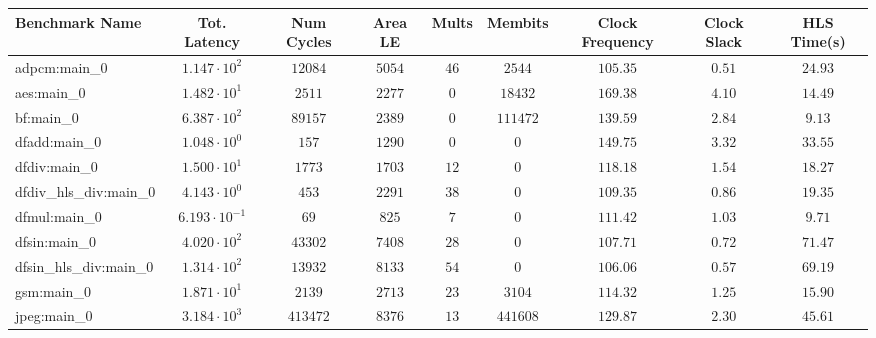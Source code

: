 \begin{tabular}{|l|c|c|c|c|c|c|c|c|}
\hline
Benchmark Name          & Tot. Latency            & Num Cycles & Area LE   & Mults   & Membits    & Clock Frequency & Clock Slack & HLS Time(s) \\
\hline
adpcm:main\_0           & $ 1.147 \cdot 10^{2}  $ & $ 12084  $ & $ 5054  $ & $ 46  $ & $ 2544   $ & $ 105.35      $ & $ 0.51    $ & $ 24.93   $ \\
aes:main\_0             & $ 1.482 \cdot 10^{1}  $ & $ 2511   $ & $ 2277  $ & $ 0   $ & $ 18432  $ & $ 169.38      $ & $ 4.10    $ & $ 14.49   $ \\
bf:main\_0              & $ 6.387 \cdot 10^{2}  $ & $ 89157  $ & $ 2389  $ & $ 0   $ & $ 111472 $ & $ 139.59      $ & $ 2.84    $ & $ 9.13    $ \\
dfadd:main\_0           & $ 1.048 \cdot 10^{0}  $ & $ 157    $ & $ 1290  $ & $ 0   $ & $ 0      $ & $ 149.75      $ & $ 3.32    $ & $ 33.55   $ \\
dfdiv:main\_0           & $ 1.500 \cdot 10^{1}  $ & $ 1773   $ & $ 1703  $ & $ 12  $ & $ 0      $ & $ 118.18      $ & $ 1.54    $ & $ 18.27   $ \\
dfdiv\_hls\_div:main\_0 & $ 4.143 \cdot 10^{0}  $ & $ 453    $ & $ 2291  $ & $ 38  $ & $ 0      $ & $ 109.35      $ & $ 0.86    $ & $ 19.35   $ \\
dfmul:main\_0           & $ 6.193 \cdot 10^{-1} $ & $ 69     $ & $ 825   $ & $ 7   $ & $ 0      $ & $ 111.42      $ & $ 1.03    $ & $ 9.71    $ \\
dfsin:main\_0           & $ 4.020 \cdot 10^{2}  $ & $ 43302  $ & $ 7408  $ & $ 28  $ & $ 0      $ & $ 107.71      $ & $ 0.72    $ & $ 71.47   $ \\
dfsin\_hls\_div:main\_0 & $ 1.314 \cdot 10^{2}  $ & $ 13932  $ & $ 8133  $ & $ 54  $ & $ 0      $ & $ 106.06      $ & $ 0.57    $ & $ 69.19   $ \\
gsm:main\_0             & $ 1.871 \cdot 10^{1}  $ & $ 2139   $ & $ 2713  $ & $ 23  $ & $ 3104   $ & $ 114.32      $ & $ 1.25    $ & $ 15.90   $ \\
jpeg:main\_0            & $ 3.184 \cdot 10^{3}  $ & $ 413472 $ & $ 8376  $ & $ 13  $ & $ 441608 $ & $ 129.87      $ & $ 2.30    $ & $ 45.61   $ \\

\end{tabular}
